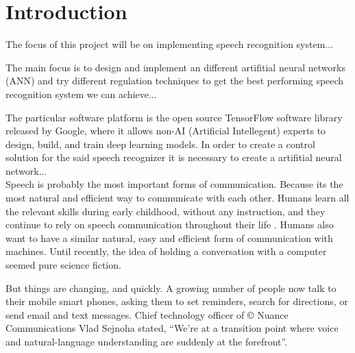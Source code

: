 \chapter{Introduction}\label{ch:introduction}

The focus of this project will be on implementing speech recognition system...

The main focus is to design and implement an different artifitial neural networks (ANN) and try different regulation techniques to get the best performing speech recognition system we can achieve...

The particular software platform is the open source TensorFlow \cite{tensorflow2015-whitepaper} software library released by Google, where it allows non-AI (Artificial Intellegent) experts to design, build, and train deep learning models. In order to create a control solution for the said speech recognizer it is necessary to create a artifitial neural network...\\

Speech is probably the most important forms of communication. Because its the most natural and efficient way to communicate with each other. Humans learn all the relevant skills during early childhood, without any instruction, and they continue to rely on speech communication throughout their life \cite{kamblespeech}. Humans also want to have a similar natural, easy and efficient form of communication with machines. Until recently, the idea of holding a conversation with a computer seemed pure science fiction.

But things are changing, and quickly. A growing number of people now talk to their mobile smart phones, asking them to set reminders, search for directions, or send email and text messages. Chief technology officer of © Nuance Communications Vlad Sejnoha stated, “We’re at a transition point where voice and natural-language understanding are suddenly at the forefront”.




\cite{kamblespeech}
 






